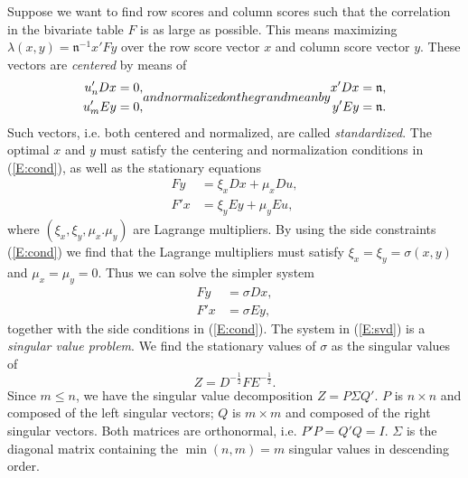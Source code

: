 \documentclass[article]{Z}
\begin{document}
Suppose we want to find row scores and column scores such that the correlation in the bivariate table \(F\) is as large as possible. This means maximizing \(\lambda(x,y)=\mathfrak{n}^{-1}x'Fy\) over the row score vector \(x\) and column score vector \(y\). These vectors are \emph{centered} by means of
\begin{subequations}\label{E:cond}
\begin{align}
u_n'Dx&=0,\\
u_m'Ey&=0,
\end{align}
and \emph{normalized} on the grand mean by
\begin{align}
x'Dx&=\mathfrak{n},\\
y'Ey&=\mathfrak{n}.
\end{align}
\end{subequations}
Such vectors, i.e. both centered and normalized, are called \emph{standardized}. The optimal \(x\) and \(y\) must satisfy the centering and normalization conditions in (\ref{E:cond}), as well as the stationary equations
\begin{subequations}\label{E:lagr}
\begin{align}
Fy&=\xi_x Dx+\mu_x Du,\\
F'x&=\xi_y Ey+\mu_y Eu,
\end{align}
\end{subequations}
where \((\xi_x,\xi_y,\mu_x.\mu_y)\) are Lagrange multipliers.
By using the side constraints (\ref{E:cond}) we find that the Lagrange multipliers must satisfy \(\xi_x=\xi_y=\sigma(x,y)\) and \(\mu_x=\mu_y=0\). Thus we can solve the simpler system
\begin{subequations}\label{E:svd}
\begin{align}
Fy&=\sigma Dx,\\
F'x&=\sigma Ey,
\end{align}
\end{subequations}
together with the side conditions in (\ref{E:cond}). The system in (\ref{E:svd}) is a \emph{singular value problem}. We find the stationary values of \(\sigma\) as the singular values of 
\begin{equation}
\label{eq:Zca}
Z=D^{-\frac12}FE^{-\frac12}. 
\end{equation}
Since \(m\leq n\), we have the singular value decomposition \(Z=P\Sigma Q'\). $P$ is $n\times n$ and composed of the left singular vectors; $Q$ is $m\times m$ and composed of the right singular vectors. Both matrices are orthonormal, i.e. $P'P=Q'Q=I$. $\Sigma$ is the diagonal matrix containing the $\min(n,m)=m$ singular values in descending order.
\end{document}
